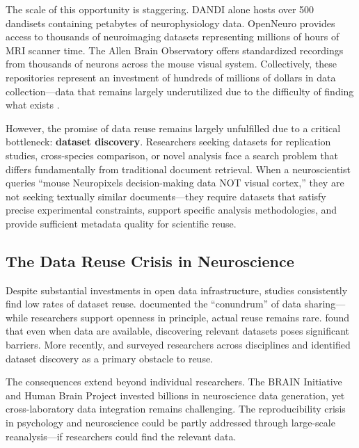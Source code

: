 \documentclass{article}
\theoremstyle{definition}
\begin{document}
The scale of this opportunity is staggering. DANDI alone hosts over 500 dandisets containing petabytes of neurophysiology data. OpenNeuro provides access to thousands of neuroimaging datasets representing millions of hours of MRI scanner time. The Allen Brain Observatory offers standardized recordings from thousands of neurons across the mouse visual system. Collectively, these repositories represent an investment of hundreds of millions of dollars in data collection---data that remains largely underutilized due to the difficulty of finding what exists \citep{wilkinson2016fair, tenopir2020data}.

However, the promise of data reuse remains largely unfulfilled due to a critical bottleneck: \textbf{dataset discovery}. Researchers seeking datasets for replication studies, cross-species comparison, or novel analysis face a search problem that differs fundamentally from traditional document retrieval. When a neuroscientist queries ``mouse Neuropixels decision-making data NOT visual cortex,'' they are not seeking textually similar documents---they require datasets that satisfy precise experimental constraints, support specific analysis methodologies, and provide sufficient metadata quality for scientific reuse.

\subsection{The Data Reuse Crisis in Neuroscience}

Despite substantial investments in open data infrastructure, studies consistently find low rates of dataset reuse. \citet{borgman2012conundrum} documented the ``conundrum'' of data sharing---while researchers support openness in principle, actual reuse remains rare. \citet{wallis2013if} found that even when data are available, discovering relevant datasets poses significant barriers. More recently, \citet{cousijn2018data} and \citet{tedersoo2021data} surveyed researchers across disciplines and identified dataset discovery as a primary obstacle to reuse.

The consequences extend beyond individual researchers. The BRAIN Initiative \citep{jorgenson2015brain} and Human Brain Project \citep{amunts2016human} invested billions in neuroscience data generation, yet cross-laboratory data integration remains challenging. The reproducibility crisis in psychology and neuroscience \citep{button2013power, open2015estimating} could be partly addressed through large-scale reanalysis---if researchers could find the relevant data.
\end{document}
